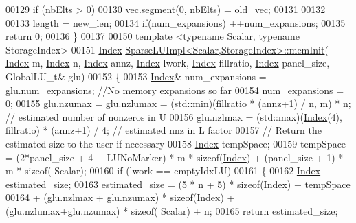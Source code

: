 \begin{DoxyCode}
00129   \textcolor{keywordflow}{if} (nbElts > 0)
00130     vec.segment(0, nbElts) = old\_vec;   
00131    
00132   
00133   length  = new\_len;
00134   \textcolor{keywordflow}{if}(num\_expansions) ++num\_expansions;
00135   \textcolor{keywordflow}{return} 0; 
00136 \}
00137 
00150 \textcolor{keyword}{template} <\textcolor{keyword}{typename} Scalar, \textcolor{keyword}{typename} StorageIndex>
00151 \hyperlink{namespace_eigen_a62e77e0933482dafde8fe197d9a2cfde}{Index} \hyperlink{group___sparse_l_u___module_ac018b8ed9664d4e19e34f1ff2d6c578a}{SparseLUImpl<Scalar,StorageIndex>::memInit}(
      \hyperlink{namespace_eigen_a62e77e0933482dafde8fe197d9a2cfde}{Index} m, \hyperlink{namespace_eigen_a62e77e0933482dafde8fe197d9a2cfde}{Index} n, \hyperlink{namespace_eigen_a62e77e0933482dafde8fe197d9a2cfde}{Index} annz, \hyperlink{namespace_eigen_a62e77e0933482dafde8fe197d9a2cfde}{Index} lwork, \hyperlink{namespace_eigen_a62e77e0933482dafde8fe197d9a2cfde}{Index} fillratio, 
      \hyperlink{namespace_eigen_a62e77e0933482dafde8fe197d9a2cfde}{Index} panel\_size,  GlobalLU\_t& glu)
00152 \{
00153   \hyperlink{namespace_eigen_a62e77e0933482dafde8fe197d9a2cfde}{Index}& num\_expansions = glu.num\_expansions; \textcolor{comment}{//No memory expansions so far}
00154   num\_expansions = 0;
00155   glu.nzumax = glu.nzlumax = (std::min)(fillratio * (annz+1) / n, m) * n; \textcolor{comment}{// estimated number of nonzeros
       in U }
00156   glu.nzlmax = (std::max)(\hyperlink{namespace_eigen_a62e77e0933482dafde8fe197d9a2cfde}{Index}(4), fillratio) * (annz+1) / 4; \textcolor{comment}{// estimated  nnz in L factor}
00157   \textcolor{comment}{// Return the estimated size to the user if necessary}
00158   \hyperlink{namespace_eigen_a62e77e0933482dafde8fe197d9a2cfde}{Index} tempSpace;
00159   tempSpace = (2*panel\_size + 4 + LUNoMarker) * m * \textcolor{keyword}{sizeof}(\hyperlink{namespace_eigen_a62e77e0933482dafde8fe197d9a2cfde}{Index}) + (panel\_size + 1) * m * \textcolor{keyword}{sizeof}(
      Scalar);
00160   \textcolor{keywordflow}{if} (lwork == emptyIdxLU) 
00161   \{
00162     \hyperlink{namespace_eigen_a62e77e0933482dafde8fe197d9a2cfde}{Index} estimated\_size;
00163     estimated\_size = (5 * n + 5) * \textcolor{keyword}{sizeof}(\hyperlink{namespace_eigen_a62e77e0933482dafde8fe197d9a2cfde}{Index})  + tempSpace
00164                     + (glu.nzlmax + glu.nzumax) * \textcolor{keyword}{sizeof}(\hyperlink{namespace_eigen_a62e77e0933482dafde8fe197d9a2cfde}{Index}) + (glu.nzlumax+glu.nzumax) *  \textcolor{keyword}{sizeof}(
      Scalar) + n; 
00165     \textcolor{keywordflow}{return} estimated\_size;

\end{DoxyCode}
